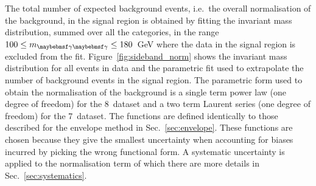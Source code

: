 The total number of expected background events, i.e.~the overall normalisation of the background, in the signal region is obtained by fitting the invariant mass distribution, summed over all the categories, in the range $100 \leq \mgg \leq 180$~GeV where the data in the signal region is excluded from the fit. Figure~\ref{fig:sideband_norm} shows the invariant mass distribution for all events in data and the parametric fit used to extrapolate the number of background events in the signal region. The parametric form used to obtain the normalisation of the background is a single term power law (one degree of freedom) for the 8~\TeV dataset and a two term Laurent series (one degree of freedom) for the 7~\TeV dataset. The functions are defined identically to those described for the envelope method in Sec.~\ref{sec:envelope}. These functions are chosen because they give the smallest uncertainty when accounting for biases incurred by picking the wrong functional form. A systematic uncertainty is applied to the normalisation term of which there are more details in Sec.~\ref{sec:systematics}.

